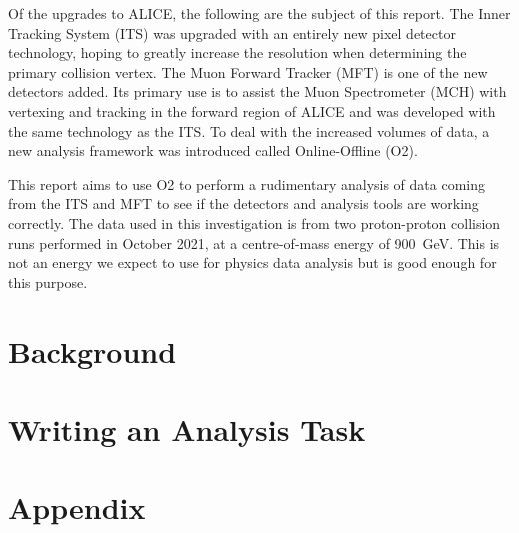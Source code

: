 \documentclass[11pt]{article}
\numberwithin{equation}{section}
\numberwithin{figure}{section}
\numberwithin{table}{section}
\begin{document}
Of the upgrades to ALICE, the following are the subject of this report. The Inner Tracking System (ITS) was upgraded with an entirely new pixel detector technology, hoping to greatly increase the resolution when determining the primary collision vertex. The Muon Forward Tracker (MFT) is one of the new detectors added. Its primary use is to assist the Muon Spectrometer (MCH) with vertexing and tracking in the forward region of ALICE and was developed with the same technology as the ITS. To deal with the increased volumes of data, a new analysis framework was introduced called Online-Offline (O2).

This report aims to use O2 to perform a rudimentary analysis of data coming from the ITS and MFT to see if the detectors and analysis tools are working correctly. The data used in this investigation is from two proton-proton collision runs performed in October 2021, at a centre-of-mass energy of \SI{900}{\giga\electronvolt}. This is not an energy we expect to use for physics data analysis but is good enough for this purpose.

\section{Background}\label{sec:Background}


\section{Writing an Analysis Task}\label{sec:AnalysisTask}



\newpage
\printbibliography

\newpage
\section*{Appendix}
\appendix

\end{document}
